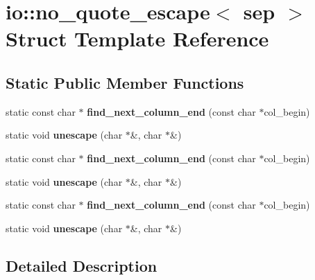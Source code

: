 \hypertarget{structio_1_1no__quote__escape}{}\section{io\+:\+:no\+\_\+quote\+\_\+escape$<$ sep $>$ Struct Template Reference}
\label{structio_1_1no__quote__escape}
\subsection*{Static Public Member Functions}
\begin{DoxyCompactItemize}
\item 
\mbox{\label{structio_1_1no__quote__escape_add17b043bb89445079a0448026ce86d0}} 
static const char $\ast$ {\bfseries find\+\_\+next\+\_\+column\+\_\+end} (const char $\ast$col\+\_\+begin)
\item 
\mbox{\label{structio_1_1no__quote__escape_af1c217f2c995d178a91c58235191b052}} 
static void {\bfseries unescape} (char $\ast$\&, char $\ast$\&)
\item 
\mbox{\label{structio_1_1no__quote__escape_add17b043bb89445079a0448026ce86d0}} 
static const char $\ast$ {\bfseries find\+\_\+next\+\_\+column\+\_\+end} (const char $\ast$col\+\_\+begin)
\item 
\mbox{\label{structio_1_1no__quote__escape_af1c217f2c995d178a91c58235191b052}} 
static void {\bfseries unescape} (char $\ast$\&, char $\ast$\&)
\item 
\mbox{\label{structio_1_1no__quote__escape_add17b043bb89445079a0448026ce86d0}} 
static const char $\ast$ {\bfseries find\+\_\+next\+\_\+column\+\_\+end} (const char $\ast$col\+\_\+begin)
\item 
\mbox{\label{structio_1_1no__quote__escape_af1c217f2c995d178a91c58235191b052}} 
static void {\bfseries unescape} (char $\ast$\&, char $\ast$\&)
\end{DoxyCompactItemize}


\subsection{Detailed Description}
